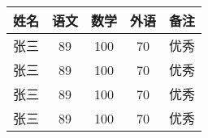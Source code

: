 \documentclass{ctexart} %
\begin{document}
	\begin{tabular}{l ||c |c |c |p{1.5cm}}
		\hline \hline
		姓名 & 语文 & 数学 & 外语 & 备注\\
		\hline
		张三 & 89 & 100 & 70 & 优秀\\
		张三 & 89 & 100 & 70 & 优秀\\
		张三 & 89 & 100 & 70 & 优秀\\
		张三 & 89 & 100 & 70 & 优秀\\
		
		\hline
		\hline
	\end{tabular}
\end{document}
